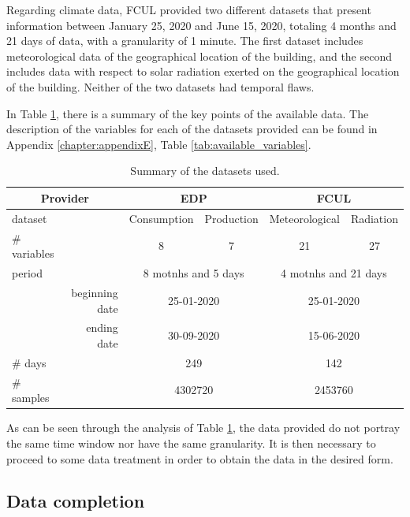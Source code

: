 Regarding climate data, \ac{FCUL} provided two different datasets that present information between January 25, 2020 and June 15, 2020, totaling 4 months and 21 days of data, with a granularity of 1 minute. The first dataset includes meteorological data of the geographical location of the building, and the second includes data with respect to solar radiation exerted on the geographical location of the building. Neither of the two datasets had temporal flaws.

In Table \ref{table2}, there is a summary of the key points of the available data. The description of the variables for each of the datasets provided can be found in Appendix \ref{chapter:appendixE}, Table \ref{tab:available_variables}.

\begin{table}[htbp]
  \centering
  \caption{Summary of the datasets used.}
    \begin{tabular}{lr|cccc}
    \toprule
    \multicolumn{2}{c|}{\textbf{Provider}} & \multicolumn{2}{c}{\textbf{EDP}} & \multicolumn{2}{c}{\textbf{FCUL}} \\
    \midrule
    dataset &       & Consumption & Production & Meteorological & Radiation \\
    \# variables &       & 8     & 7     & 21    & 27 \\
    period &       & \multicolumn{2}{c}{8 motnhs and 5 days} & \multicolumn{2}{c}{4 motnhs and 21 days} \\
          & beginning date & \multicolumn{2}{c}{25-01-2020} & \multicolumn{2}{c}{25-01-2020} \\
          & ending date& \multicolumn{2}{c}{30-09-2020} & \multicolumn{2}{c}{15-06-2020} \\
    \# days &       & \multicolumn{2}{c}{249} & \multicolumn{2}{c}{142} \\
    \# samples &       & \multicolumn{2}{c}{4302720} & \multicolumn{2}{c}{2453760} \\
    \end{tabular}%
  \label{table2}%
\end{table}%


As can be seen through the analysis of Table \ref{table2}, the data provided do not portray the same time window nor have the same granularity. It is then necessary to proceed to some data treatment in order to obtain the data in the desired form.

\subsection{Data completion}\label{chap3:subsec:data_completion}


